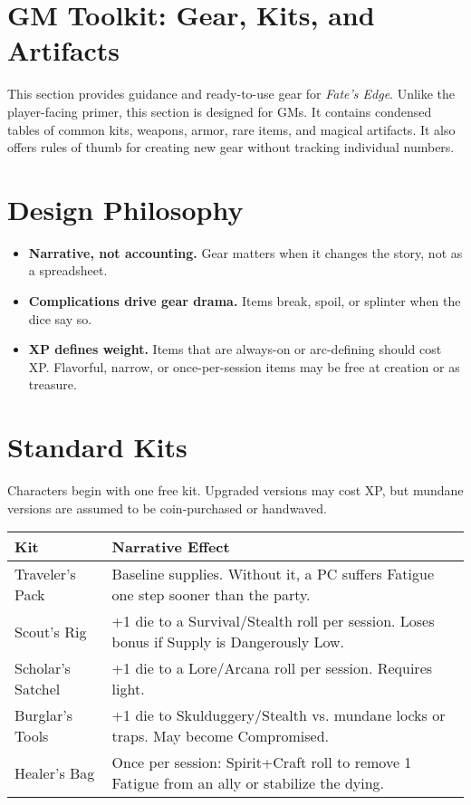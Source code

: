 \documentclass[12pt]{book}
\begin{document}
\section{GM Toolkit: Gear, Kits, and Artifacts}

This section provides guidance and ready-to-use gear for \textit{Fate’s Edge}.  
Unlike the player-facing primer, this section is designed for GMs.  
It contains condensed tables of common kits, weapons, armor, rare items, and magical artifacts.  
It also offers rules of thumb for creating new gear without tracking individual numbers.

\section{Design Philosophy}
\begin{itemize}
  \item \textbf{Narrative, not accounting.} Gear matters when it changes the story, not as a spreadsheet.
  \item \textbf{Complications drive gear drama.} Items break, spoil, or splinter when the dice say so.
  \item \textbf{XP defines weight.} Items that are always-on or arc-defining should cost XP.  
  Flavorful, narrow, or once-per-session items may be free at creation or as treasure.
\end{itemize}

\section{Standard Kits}
Characters begin with one free kit. Upgraded versions may cost XP, but mundane versions are assumed to be coin-purchased or handwaved.

\begin{tabularx}{\textwidth}{lX}
\textbf{Kit} & \textbf{Narrative Effect} \\
\hline
Traveler’s Pack & Baseline supplies. Without it, a PC suffers Fatigue one step sooner than the party. \\
Scout’s Rig & +1 die to a Survival/Stealth roll per session. Loses bonus if Supply is Dangerously Low. \\
Scholar’s Satchel & +1 die to a Lore/Arcana roll per session. Requires light. \\
Burglar’s Tools & +1 die to Skulduggery/Stealth vs. mundane locks or traps. May become Compromised. \\
Healer’s Bag & Once per session: Spirit+Craft roll to remove 1 Fatigue from an ally or stabilize the dying. \\
\end{tabularx}
\end{document}
